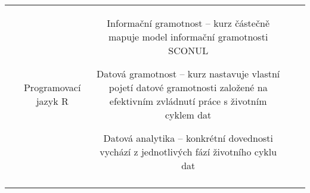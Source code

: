 \begin{landscape}
\begin{table}[htbp]
{\begin{tabularx}{\linewidth}{CCCCC}
&

Programovací jazyk R

&

Informační gramotnost – kurz částečně mapuje model informační gramotnosti SCONUL

Datová gramotnost – kurz nastavuje vlastní pojetí datové gramotnosti založené na efektivním zvládnutí práce s životním cyklem dat 

Datová analytika – konkrétní dovednosti vychází z jednotlivých fází životního cyklu dat

\\

\tabularnewline
\bottomrule
\end{tabularx}

}

\end{table}

\end{landscape}
